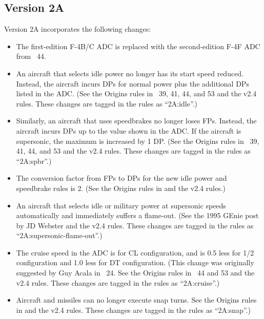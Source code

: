 \documentclass[10pt]{article}
\begin{document}
\subsection{Version 2A}

Version 2A incorporates the following changes:

\begin{itemize}

    \item The first-edition F-4B/C ADC is replaced with the second-edition F-4F ADC from {\APJ}~44.

    \item An aircraft that selects idle power no longer has its start speed reduced. Instead, the aircraft incurs DPs for normal power plus the additional DPs listed in the ADC. (See the Origins rules in {\APJ}~39, 41, 44, and 53 and the v2.4 rules. These changes are tagged in the rules as “2A:idle”.) 

    \item Similarly, an aircraft that uses speedbrakes no longer loses FPs. Instead, the aircraft incurs DPs up to the value shown in the ADC. If the aircraft is supersonic, the maximum is increased by 1 DP. (See the Origins rules in {\APJ}~39, 41, 44, and 53 and the v2.4 rules. These changes are tagged in the rules as “2A:spbr”.) 

    \item The conversion factor from FPs to DPs for the new idle power and speedbrake rules is 2. (See the Origins rules in {} and the v2.4 rules.)

    \item An aircraft that selects idle or military power at supersonic speeds automatically and immediately suffers a flame-out. (See the 1995 GEnie post by JD Webster and the v2.4 rules. These changes are tagged in the rules as “2A:supersonic-flame-out”.)

    \item The cruise speed in the ADC is for CL configuration, and is 0.5 less for 1/2 configuration and 1.0 less for DT configuration. (This change was originally suggested by Guy Acala in {\APJ}~24. See the Origins rules in {\APJ}~44 and 53 and the v2.4 rules. These changes are tagged in the rules as “2A:cruise”.) 

    \item Aircraft and missiles can no longer execute snap turns. See the Origins rules in {} and the v2.4 rules. These changes are tagged in the rules as “2A:snap”.)


\end{itemize}
\end{document}
